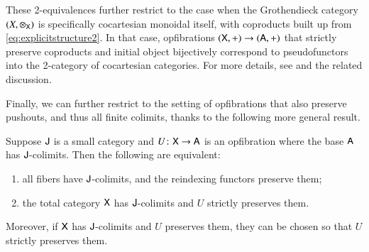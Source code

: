 \documentclass[reqno]{amsart}
\begin{document}
\begin{comment}
In more detail, if $(\phi,\phi_0)$ is the lax monoidal structure of the pseudofunctor $F$ as recalled in \cref{subsec:bicats}, the induced monoidal structure on the total Grothendieck category $\X=\inta F$ (\cref{def:GrothCat}) is given by
\begin{equation}\label{eq:explicitstructure2}
\Big(a,x\in F(a)\Big)\ot_{\X}\Big(b,y\in F(b)\Big)=\Big(a+b,\phi_{a,b}(x,y)\in F(a+b)\Big), \qquad I_{\X}=\Big(0_A,\phi_0\Big)
\end{equation}
Moreover, each fiber $\X_a=F(a)$ obtains a monoidal structure via 
\begin{equation}\label{eq:explicitstructure1}
\otimes_a\maps F(a)\times F(a)\xrightarrow{\phi_{a,a}}F(a+a)\xrightarrow{F(\nabla)}F(a),\quad
I_a\maps\one\xrightarrow{\phi_0}F(0)\xrightarrow{F(!)}F(a)
\end{equation}
where $\nabla$ is the fold map.   SYMMETRIC MONOIDAL STRUCTURE??? %
\end{proof}
\end{comment}

These 2-equivalences further restrict to the case when the Grothendieck category $(X,\otimes_{\mathsf{X}})$ is specifically cocartesian monoidal itself, with coproducts built up from \cref{eq:explicitstructure2}. In that case, opfibrations $(\mathsf{X},+) \to (\mathsf{A},+)$ that strictly preserve coproducts and initial object bijectively correspond to pseudofunctors into the 2-category of cocartesian categories.  For more details, see \cite[Corollary 4.7]{MV} and the related discussion.

Finally, we can further restrict to the setting of opfibrations that also preserve pushouts, and thus all finite colimits, thanks to the following more general result.

\begin{lem} \label{lem:fibrewiselimits}
Suppose $\mathsf{J}$ is a small category and $U \colon \mathsf{X} \to \mathsf{A}$ is an opfibration where the base 
$\mathsf{A}$ has $\mathsf{J}$-colimits.  Then the following are equivalent:
\begin{enumerate}
 \item all fibers have $\mathsf{J}$-colimits, and the reindexing functors preserve them;
 \item the total category $\mathsf{X}$ has $\mathsf{J}$-colimits and $U$ strictly preserves them.
\end{enumerate}
Moreover, if $\mathsf{X}$ has $\mathsf{J}$-colimits and $U$ preserves them, they can be chosen so that $U$ strictly preserves them.   
\end{lem}
\end{document}
